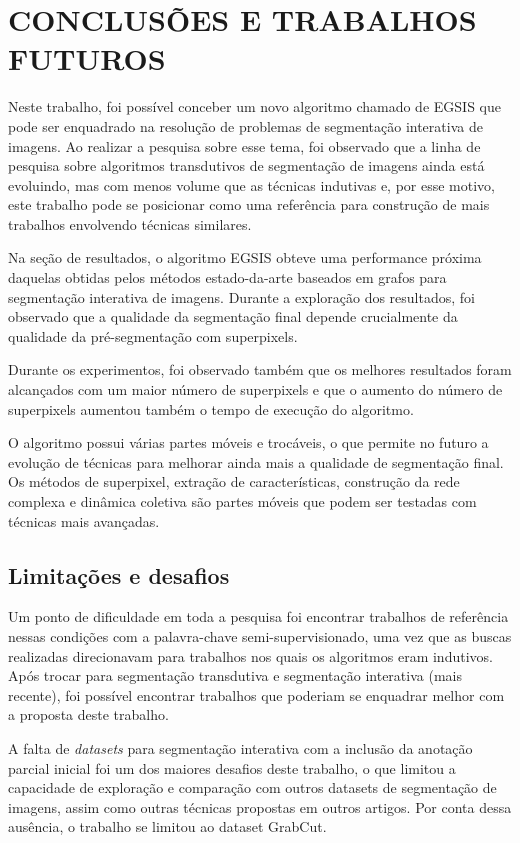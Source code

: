 \chapter{CONCLUSÕES E TRABALHOS FUTUROS}\label{chap:conclusoes-e-trabalhos-futuros}

Neste trabalho, foi possível conceber um novo algoritmo chamado de
\gls{EGSIS} que pode ser enquadrado na resolução de problemas de
segmentação interativa de imagens. Ao realizar a pesquisa sobre esse
tema, foi observado que a linha de pesquisa sobre algoritmos
transdutivos de segmentação de imagens ainda está evoluindo, mas com
menos volume que as técnicas indutivas e, por esse motivo, este
trabalho pode se posicionar como uma referência para construção de
mais trabalhos envolvendo técnicas similares.

Na seção de resultados, o algoritmo \gls{EGSIS} obteve uma performance
próxima daquelas obtidas pelos métodos estado-da-arte baseados em
grafos para segmentação interativa de imagens. Durante a exploração
dos resultados, foi observado que a qualidade da segmentação final
depende crucialmente da qualidade da pré-segmentação com superpixels.

Durante os experimentos, foi observado também que os melhores
resultados foram alcançados com um maior número de superpixels e que
o aumento do número de superpixels aumentou também o tempo de
execução do algoritmo.

O algoritmo possui várias partes móveis e trocáveis, o que permite no
futuro a evolução de técnicas para melhorar ainda mais a qualidade de
segmentação final. Os métodos de superpixel, extração de
características, construção da rede complexa e dinâmica coletiva são
partes móveis que podem ser testadas com técnicas mais avançadas.

\section{Limitações e desafios}\label{sec:limitacoes-desafios}

Um ponto de dificuldade em toda a pesquisa foi encontrar trabalhos de
referência nessas condições com a palavra-chave semi-supervisionado,
uma vez que as buscas realizadas direcionavam para trabalhos nos quais
os algoritmos eram indutivos. Após trocar para segmentação transdutiva
e segmentação interativa (mais recente), foi possível encontrar
trabalhos que poderiam se enquadrar melhor com a proposta deste trabalho.

A falta de \textit{datasets} para segmentação interativa com a
inclusão da anotação parcial inicial foi um dos maiores desafios
deste trabalho, o que limitou a capacidade de exploração e comparação
com outros datasets de segmentação de imagens, assim como outras
técnicas propostas em outros artigos. Por conta dessa ausência, o
trabalho se limitou ao dataset GrabCut.

